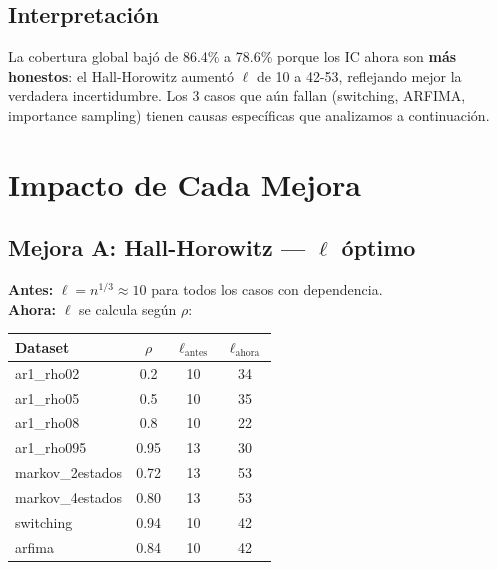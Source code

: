 \documentclass[12pt,a4paper]{article}
\begin{document}
\subsection{Interpretación}

La cobertura global bajó de 86.4\% a 78.6\% porque los IC ahora son \textbf{más honestos}: el Hall-Horowitz aumentó $\ell$ de 10 a 42-53, reflejando mejor la verdadera incertidumbre. Los 3 casos que aún fallan (switching, ARFIMA, importance sampling) tienen causas específicas que analizamos a continuación.

\newpage

\section{Impacto de Cada Mejora}

\subsection{Mejora A: Hall-Horowitz --- $\ell$ óptimo}

\textbf{Antes:} $\ell = n^{1/3} \approx 10$ para todos los casos con dependencia.\\
\textbf{Ahora:} $\ell$ se calcula según $\rho$:

\begin{longtable}{@{}lccc@{}}
	\toprule
	Dataset          & $\rho$ & $\ell_{\text{antes}}$ & $\ell_{\text{ahora}}$ \\
	\midrule
	\endhead
	ar1\_rho02       & 0.2    & 10                    & 34                    \\
	ar1\_rho05       & 0.5    & 10                    & 35                    \\
	ar1\_rho08       & 0.8    & 10                    & 22                    \\
	ar1\_rho095      & 0.95   & 13                    & 30                    \\
	markov\_2estados & 0.72   & 13                    & 53                    \\
	markov\_4estados & 0.80   & 13                    & 53                    \\
	switching        & 0.94   & 10                    & 42                    \\
	arfima           & 0.84   & 10                    & 42                    \\
	\bottomrule
\end{longtable}
\end{document}
